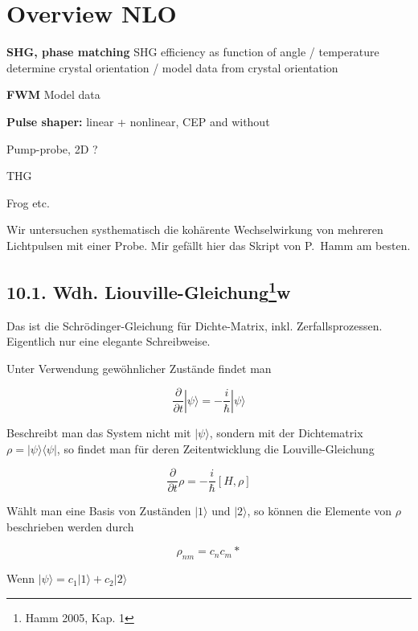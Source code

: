 

\chapter{Overview NLO}




\textbf{SHG, phase matching
}
SHG efficiency as function of angle / temperature
determine crystal orientation / model data from crystal orientation

\textbf{FWM}
Model data

\textbf{Pulse shaper:} linear + nonlinear, CEP and without

Pump-probe, 2D ?

THG

Frog etc.



Wir untersuchen systhematisch die kohärente Wechselwirkung
von mehreren Lichtpulsen mit einer Probe. Mir gefällt hier
das Skript von P.~Hamm am besten.

\section{10.1. Wdh. Liouville-Gleichung\protect\footnote{Hamm 2005, Kap. 1}\hfill w} 

Das ist  die Schrödinger-Gleichung für Dichte-Matrix, inkl.
Zerfallsprozessen. Eigentlich nur eine elegante
Schreibweise.

Unter Verwendung gewöhnlicher Zustände findet man

\begin{equation}
    \frac{\partial}{\partial t}|\psi\rangle = -\frac{i}{\hbar}|\psi\rangle
\end{equation}

Beschreibt man das System nicht mit $|\psi\rangle$, sondern mit der Dichtematrix $\rho = |\psi\rangle\langle\psi|$, so findet man für deren Zeitentwicklung die Louville-Gleichung

\begin{equation}
     \frac{\partial}{\partial t}\rho = -\frac{i}{\hbar}[H,\rho]
\end{equation}

Wählt man eine Basis von Zuständen $|1\rangle$ und $|2\rangle$, so können die Elemente von $\rho$ beschrieben werden durch

\begin{equation}
    \rho_{nm} = c_nc_m*
\end{equation}

Wenn $|\psi\rangle = c_1|1\rangle + c_2|2\rangle$

